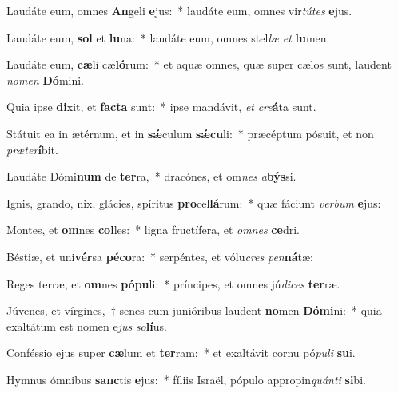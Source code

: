 \item Laudáte eum, omnes \textbf{An}geli \textbf{e}jus:~* laudáte eum, omnes vir\textit{tú}\textit{tes} \textbf{e}jus.
\item Laudáte eum, \textbf{sol} et \textbf{lu}na:~* laudáte eum, omnes stel\textit{læ} \textit{et} \textbf{lu}men.
\item Laudáte eum, \textbf{cæ}li cæ\textbf{ló}rum:~* et aquæ omnes, quæ super cælos sunt, laudent \textit{no}\textit{men} \textbf{Dó}mini.
\item Quia ipse \textbf{di}xit, et \textbf{fac}\textbf{ta} sunt:~* ipse mandávit, \textit{et} \textit{cre}\textbf{á}ta sunt.
\item Státuit ea in ætérnum, et in \textbf{sǽ}culum \textbf{sǽ}\textbf{cu}li:~* præcéptum pósuit, et non \textit{præ}\textit{ter}\textbf{í}bit.
\item Laudáte Dómi\textbf{num} de \textbf{ter}ra,~* dracónes, et om\textit{nes} \textit{a}\textbf{býs}si.
\item Ignis, grando, nix, glácies, spíritus \textbf{pro}cel\textbf{lá}rum:~* quæ fáciunt \textit{ver}\textit{bum} \textbf{e}jus:
\item Montes, et \textbf{om}nes \textbf{col}les:~* ligna fructífera, et \textit{om}\textit{nes} \textbf{ce}dri.
\item Béstiæ, et uni\textbf{vér}sa \textbf{pé}\textbf{co}ra:~* serpéntes, et vólu\textit{cres} \textit{pen}\textbf{ná}tæ:
\item Reges terræ, et \textbf{om}nes \textbf{pó}\textbf{pu}li:~* príncipes, et omnes jú\textit{di}\textit{ces} \textbf{ter}ræ.
\item Júvenes, et vírgines,~† senes cum junióribus laudent \textbf{no}men \textbf{Dó}\textbf{mi}ni:~* quia exaltátum est nomen e\textit{jus} \textit{so}\textbf{lí}us.
\item Conféssio ejus super \textbf{cæ}lum et \textbf{ter}ram:~* et exaltávit cornu pó\textit{pu}\textit{li} \textbf{su}i.
\item Hymnus ómnibus \textbf{sanc}tis \textbf{e}jus:~* fíliis Israël, pópulo appropin\textit{quán}\textit{ti} \textbf{si}bi.
